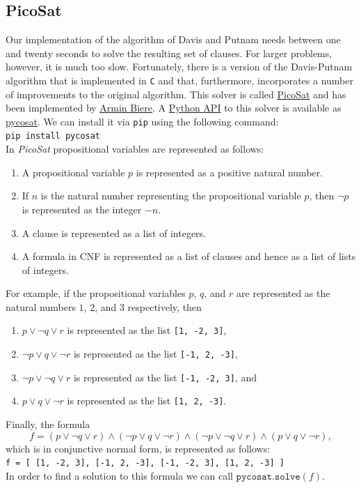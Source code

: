 \pagebreak

\hspace*{\fill}
\pagebreak

\subsection{PicoSat}
Our implementation of the algorithm of Davis and Putnam needs between one and twenty seconds to solve the
resulting set of clauses.  For larger problems, however, it is much too slow.  Fortunately, there is a version
of the Davis-Putnam algorithm that is implemented in \texttt{C} and that, furthermore, incorporates a number of
improvements to the original algorithm.  This solver is called \href{https://fmv.jku.at/picosat/}{PicoSat}
and has been implemented by \href{https://cca.informatik.uni-freiburg.de/biere/}{Armin Biere}.
A \href{https://github.com/conda/pycosat}{Python API} to this solver is available as
\href{https://pypi.org/project/pycosat/}{pycosat}.  We can install it via \texttt{pip} using the following command:
\\[0.2cm]
\hspace*{1.3cm}
\texttt{pip install pycosat}
\\[0.2cm]
In \textsl{PicoSat} propositional variables are represented as follows:
\begin{enumerate}
\item A propositional variable $p$ is represented as a positive natural number.
\item If $n$ is the natural number representing the propositional variable $p$, then $\neg p$ is represented as
      the integer $-n$. 
\item A clause is represented as a list of integers.
\item A formula in CNF is represented as a list of clauses and hence as a list of lists of integers.
\end{enumerate}
For example, if the propositional variables $p$, $q$, and $r$ are represented as the natural numbers
$1$, $2$, and $3$ respectively, then
\begin{enumerate}
\item $p \vee \neg q \vee r$ is represented as the list \texttt{[1, -2, 3]},
\item $\neg p \vee q \vee \neg r$ is represented as the list \texttt{[-1, 2, -3]},
\item $\neg p \vee \neg q \vee r$ is represented as the list \texttt{[-1, -2, 3]}, and
\item $p \vee q \vee \neg r$ is represented as the list \texttt{[1, 2, -3]}.
\end{enumerate}
Finally, the formula 
$$ f = (p \vee \neg q \vee r) \wedge (\neg p \vee q \vee \neg r) \wedge (\neg p \vee \neg q \vee r) \wedge (p \vee q \vee \neg r), $$
which is in conjunctive normal form, is represented as follows:
\\[0.2cm]
\hspace*{1.3cm}
\texttt{f = [ [1, -2, 3], [-1, 2, -3], [-1, -2, 3], [1, 2, -3] ]}
\\[0.2cm]
In order to find a solution to this formula we can call $\texttt{pycosat.solve}(f)$.

